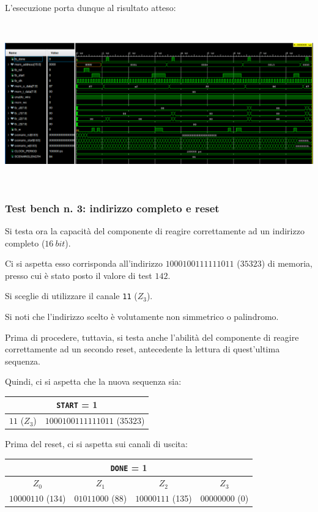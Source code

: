 \documentclass[a4paper,11pt]{article} %
\begin{document}
    L'esecuzione porta dunque al risultato atteso:
    \smallskip

    \includegraphics[height=7cm]{../res/tb-2}

    \subsubsection{Test bench n. 3: indirizzo completo e reset}
    Si testa ora la capacità del componente di reagire correttamente ad un indirizzo completo ($16\ bit$).

    Ci si aspetta esso corrisponda all'indirizzo $1000100111111011$ ($35323$) di memoria, presso cui è stato posto il valore di test $142$.

    Si sceglie di utilizzare il canale \texttt{11} ($Z_3$).

    Si noti che l'indirizzo scelto è volutamente non simmetrico o palindromo.

    Prima di procedere, tuttavia, si testa anche l'abilità del componente di reagire correttamente ad un secondo reset, antecedente la lettura di quest'ultima sequenza.

    Quindi, ci si aspetta che la nuova sequenza sia:
    \medskip

    \begin{tabular}{|c|c|}
        \hline
        \multicolumn{2}{|c|}{\texttt{START} = 1} \\
        \hline
        $11$ ($Z_3$) & $1000100111111011$ ($35323$) \\
        \hline
    \end{tabular}

    \medskip

    Prima del reset, ci si aspetta sui canali di uscita:
    \medskip

    \begin{tabular}{|c|c|c|c|}
        \hline
        \multicolumn{4}{|c|}{\texttt{DONE} = 1} \\
        \hline
        $Z_0$              & $Z_1$           & $Z_2$            & $Z_3$          \\
        \hline
        $10000110$ ($134$) & $01011000$ (88) & $10000111$ (135) & $00000000$ (0) \\
        \hline
    \end{tabular}
\end{document}
